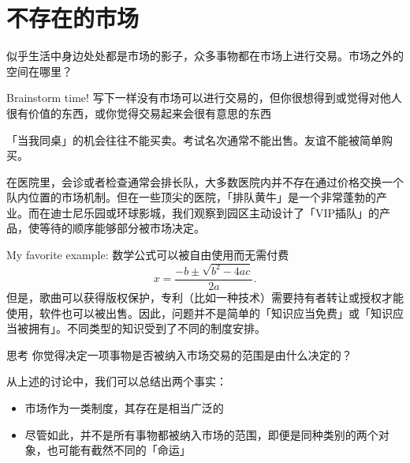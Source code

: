 \documentclass[UTF8,10pt,a4paper,scheme=chinese]{ctexart}
\begin{document}

\section{不存在的市场}

似乎生活中身边处处都是市场的影子，众多事物都在市场上进行交易。市场之外的空间在哪里？

\begin{discussionbox}{Brainstorm time!}
  写下一样没有市场可以进行交易的，但你很想得到或觉得对他人很有价值的东西，或你觉得交易起来会很有意思的东西
\end{discussionbox}

「当我同桌」的机会往往不能买卖。考试名次通常不能出售。友谊不能被简单购买。

在医院里，会诊或者检查通常会排长队，大多数医院内并不存在通过价格交换一个队内位置的市场机制。但在一些顶尖的医院，「排队黄牛」是一个非常蓬勃的产业。而在迪士尼乐园或环球影城，我们观察到园区主动设计了「VIP插队」的产品，使等待的顺序能够部分被市场决定。

My favorite example: 数学公式可以被自由使用而无需付费
\[
 x = \frac{-b \pm \sqrt{b^2 - 4ac}}{2a}.
\]
但是，歌曲可以获得版权保护，专利（比如一种技术）需要持有者转让或授权才能使用，软件也可以被出售。因此，问题并不是简单的「知识应当免费」或「知识应当被拥有」。不同类型的知识受到了不同的制度安排。

\begin{discussionbox}{思考}
  你觉得决定一项事物是否被纳入市场交易的范围是由什么决定的？
\end{discussionbox}


从上述的讨论中，我们可以总结出两个事实：
\begin{itemize}
  \item 市场作为一类制度，其存在是相当广泛的
  \item 尽管如此，并不是所有事物都被纳入市场的范围，即便是同种类别的两个对象，也可能有截然不同的「命运」
\end{itemize}
\end{document}
